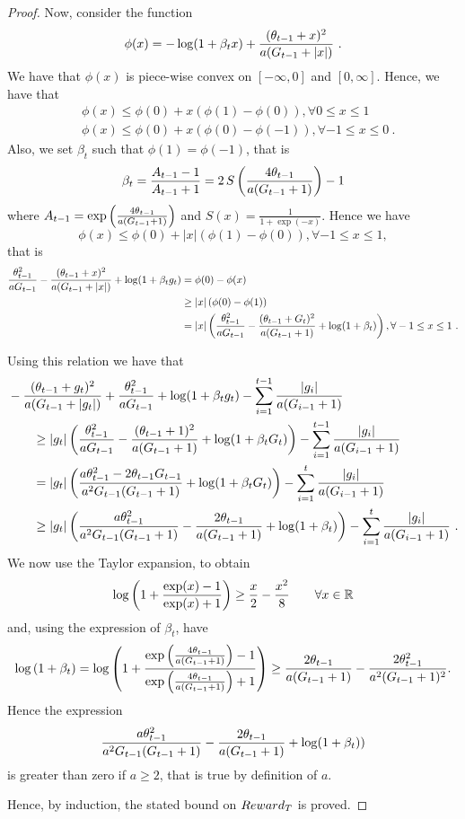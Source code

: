 \begin{proof}
Now, consider the function 
\[
\phi(x)=-\log(1+\beta_t x) + \frac{(\theta_{t-1}+x)^2}{a (G_{t-1} + |x|)}~.
\]
We have that $\phi(x)$ is piece-wise convex on $[-\infty,0]$ and $[0,\infty]$. Hence, we have that
\begin{align*}
&\phi(x) \leq \phi(0)+x (\phi(1)-\phi(0)), \forall 0 \leq x\leq 1\\
&\phi(x) \leq \phi(0)+x (\phi(0)-\phi(-1)), \forall -1 \leq x\leq 0~.
\end{align*}
Also, we set $\beta_t$ such that $\phi(1)=\phi(-1)$, that is
\[
\beta_t = \frac{A_{t-1}-1}{A_{t-1}+1} 
= 2 \, S\left(\frac{4 \theta_{t-1}}{a (G_{t-1} + 1)}\right)-1
\]
where $A_{t-1}=\exp\left(\frac{4 \theta_{t-1}}{a (G_{t-1} + 1)}\right)$ and
$S(x) =\frac{1}{1+\exp(-x)}$.
Hence we have
\[
\phi(x) \leq \phi(0)+ |x| (\phi(1)-\phi(0)), \forall -1 \leq x\leq 1,
\]
that is
\begin{align*}
\frac{\theta_{t-1}^2}{a G_{t-1}}-\frac{(\theta_{t-1}+x)^2}{a (G_{t-1} +  |x|)} + \log(1+\beta_t g_t) 
& = \phi(0) - \phi(x) \\
& \geq |x| \left(\phi(0) - \phi(1)\right) \\
&= |x| \left(\frac{\theta_{t-1}^2}{a G_{t-1}} - \frac{(\theta_{t-1}+G_t)^2}{a (G_{t-1} + 1)} + \log(1+\beta_t)\right), \forall -1 \leq x\leq 1~.
\end{align*}

Using this relation we have that
\begin{align*}
&-\frac{(\theta_{t-1}+g_t)^2}{a (G_{t-1}+|g_t|)} + \frac{\theta_{t-1}^2}{a G_{t-1}}+\log(1+\beta_t g_t)-\sum_{i=1}^{t-1} \frac{|g_i|}{a (G_{i-1} + 1)} \\
&\qquad \geq |g_t| \left(\frac{\theta_{t-1}^2}{a G_{t-1}} - \frac{(\theta_{t-1}+1)^2}{a (G_{t-1} + 1)} + \log(1+\beta_t G_t)\right) - \sum_{i=1}^{t-1} \frac{|g_i|}{a (G_{i-1} + 1)}\\
&\qquad = |g_t| \left(\frac{a \theta_{t-1}^2 -2 \theta_{t-1} G_{t-1} }{a^2 G_{t-1}(G_{t-1} + 1)} + \log(1+\beta_t G_t)\right) - \sum_{i=1}^{t} \frac{|g_i|}{a (G_{i-1} + 1)}\\
&\qquad \geq |g_t| \left(\frac{a \theta_{t-1}^2}{a^2 G_{t-1}(G_{t-1} + 1)}-\frac{2 \theta_{t-1}}{a (G_{t-1} + 1)} + \log(1+\beta_t)\right) - \sum_{i=1}^{t} \frac{|g_i|}{a (G_{i-1} + 1)}~.
\end{align*}
We now use the Taylor expansion, to obtain
\[
\log\left(1+\frac{\exp(x)-1}{\exp(x)+1}\right) \geq \frac{x}{2} -\frac{x^2}{8} \qquad \forall x \in \mathbb{R}
\]
and, using the expression of $\beta_t$, have
\[
\log\left(1+\beta_t\right) 
= \log\left(1+\frac{\exp\left(\frac{4 \theta_{t-1}}{a (G_{t-1} + 1)}\right)-1}{\exp\left(\frac{4 \theta_{t-1}}{a (G_{t-1} + 1)}\right)+1}\right) 
\geq \frac{2 \theta_{t-1}}{a (G_{t-1} + 1)} -\frac{2 \theta_{t-1}^2}{a^2 (G_{t-1} + 1)^2}.
\]
Hence the expression 
\[
\frac{a \theta_{t-1}^2}{a^2 G_{t-1}(G_{t-1} + 1)}-\frac{2 \theta_{t-1}}{a (G_{t-1} + 1)} + \log(1+\beta_t))
\]
is greater than zero if $a \geq 2$, that is true by definition of $a$.

Hence, by induction, the stated bound on $Reward_T$ is proved.
\end{proof}


